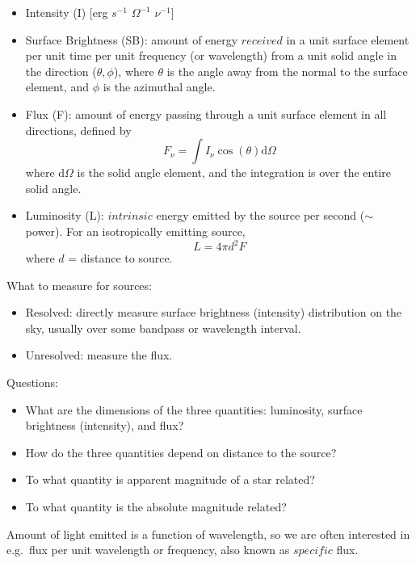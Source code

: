\documentclass[12pt]{article}
\begin{document}
\begin{itemize}
    \item Intensity (I) [erg $s^{-1}$ $\Omega^{-1}$ $\nu^{-1}$]
    \item Surface Brightness (SB): amount of energy $received$ in a unit surface
        element per unit time per unit frequency (or wavelength) from a unit
        solid angle in the direction ($\theta,\phi$), where $\theta$ is the angle
        away from the normal to the surface element, and $\phi$ is the azimuthal
        angle.
    \item Flux (F): amount of energy passing through a unit surface element
        in all directions, defined by
        \begin{equation}
            F_{\nu} = \int I_{\nu}\cos(\theta)\textrm{d}\Omega
        \end{equation}
        where d$\Omega$ is the solid angle element, and the integration is
        over the entire solid angle.
    \item Luminosity (L): $intrinsic$ energy emitted by the source per
        second ($\sim$ power). For an isotropically emitting source,
        \begin{equation}
            L = 4 \pi d^2 F
        \end{equation}
        where $d$ = distance to source.
\end{itemize}
What to measure for sources:
\begin{itemize}
    \item Resolved: directly measure surface brightness (intensity)
        distribution on the sky, usually over some bandpass or wavelength
        interval.
    \item Unresolved: measure the flux.
\end{itemize}
Questions:
\begin{itemize}
    \item What are the dimensions of the three quantities: luminosity,
        surface brightness (intensity), and flux?
    \item How do the three quantities depend on distance to the source?
    \item To what quantity is apparent magnitude of a star related?
    \item To what quantity is the absolute magnitude related?
\end{itemize}
Amount of light emitted is a function of wavelength, so we are often interested
in e.g.\ flux per unit wavelength or frequency, also known as $specific$
flux.
\end{document}
